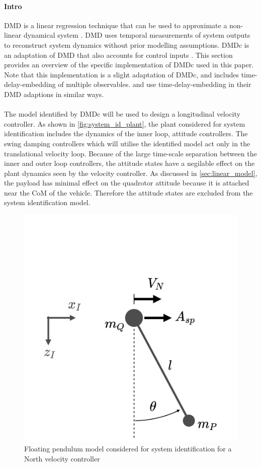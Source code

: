         \paragraph{Intro}        
        DMD is a linear regression technique that can be used to approximate a non-linear dynamical system \cite{Tu2014}.
        DMD uses temporal measurements of system outputs to reconstruct system dynamics without prior modelling assumptions.
        DMDc is an adaptation of DMD that also accounts for control inputs \cite{Proctor2016c}.
        This section provides an overview of the specific implementation of DMDc used in this paper.        
        Note that this implementation is a slight adaptation of DMDc, and includes time-delay-embedding of multiple observables. 
        \cite{Korda2018b} and \cite{Arbabi2018} use time-delay-embedding in their DMD adaptions in similar ways.

        \paragraph{}
        The model identified by DMDc will be used to design a longitudinal velocity controller.
        As shown in \ref{fig:system_id_plant}, the plant considered for system identification includes the dynamics of the inner loop, attitude controllers.
        The swing damping controllers which will utilise the identified model act only in the translational velocity loop.
        Because of the large time-scale separation between the inner and outer loop controllers, 
        the attitude states have a negilable effect on the plant dynamics seen by the velocity controller.
        As discussed in \ref{sec:linear_model}, the payload has minimal effect on the quadrotor attitude because it is attached near the CoM of the vehicle.
        Therefore the attitude states are excluded from the system identification model.

        \begin{figure}[h]
            \centering
            \includegraphics[width=0.5\linewidth]{floating_pend.png}            
            \caption{Floating pendulum model considered for system identification for a North velocity controller}
            \label{fig:floating_pend}
        \end{figure}

